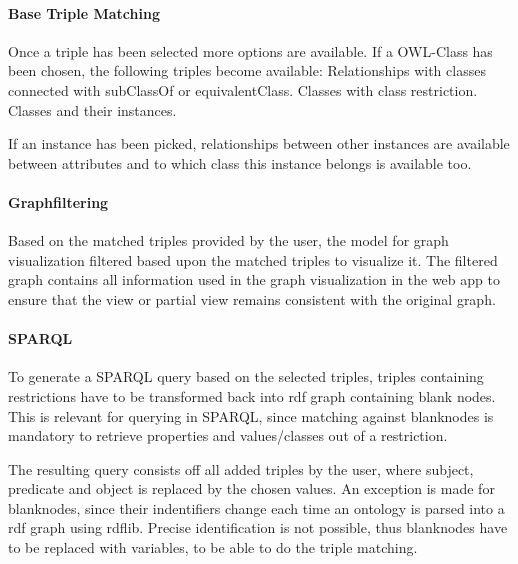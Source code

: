 \paragraph{Base Triple Matching} 
Once a triple has been selected more options are available. 
If a OWL-Class has been chosen, the following triples become available:
Relationships with classes connected with subClassOf or equivalentClass.
Classes with class restriction. 
Classes and their instances. 

If an instance has been picked, relationships between other instances are available
between attributes and to which class this instance belongs is available too.

\paragraph{Graphfiltering}
Based on the matched triples provided by the user, the model for graph visualization filtered based upon 
the matched triples to visualize it. The filtered graph contains all information used in the graph visualization in 
the web app to ensure that the view or partial view remains consistent with the original graph.

\paragraph{SPARQL}
To generate a SPARQL query based on the selected triples, triples containing restrictions have to be transformed back into 
rdf graph containing blank nodes. This is relevant for querying in SPARQL, since matching against blanknodes is mandatory to retrieve 
properties and values/classes out of a restriction. 

The resulting query consists off all added triples by the user, where subject, predicate and object is replaced by the 
chosen values. An exception is made for blanknodes, since their indentifiers change each time an ontology is parsed into 
a rdf graph using rdflib. Precise identification is not possible, thus blanknodes have to be replaced with variables, to 
be able to do the triple matching.







